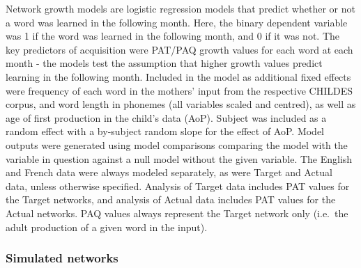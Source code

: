 \documentclass[
  english,
  man,floatsintext]{apa6}
\begin{document}
Network growth models are logistic regression models that predict whether or not a word was learned in the following month. Here, the binary dependent variable was 1 if the word was learned in the following month, and 0 if it was not. The key predictors of acquisition were PAT/PAQ growth values for each word at each month - the models test the assumption that higher growth values predict learning in the following month. Included in the model as additional fixed effects were frequency of each word in the mothers' input from the respective CHILDES corpus, and word length in phonemes (all variables scaled and centred), as well as age of first production in the child's data (AoP). Subject was included as a random effect with a by-subject random slope for the effect of AoP. Model outputs were generated using model comparisons comparing the model with the variable in question against a null model without the given variable. The English and French data were always modeled separately, as were Target and Actual data, unless otherwise specified. Analysis of Target data includes PAT values for the Target networks, and analysis of Actual data includes PAT values for the Actual networks. PAQ values always represent the Target network only (i.e.~the adult production of a given word in the input).

\hypertarget{simulated-networks}{%
\subsubsection{Simulated networks}\label{simulated-networks}}
\end{document}

